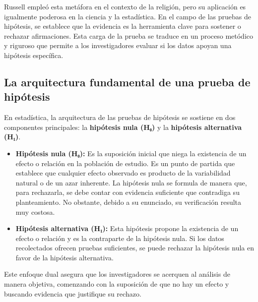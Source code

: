 \documentclass[
  letterpaper,
  DIV=11,
  numbers=noendperiod]{scrreprt}
\begin{document}
Russell empleó esta metáfora en el contexto de la religión, pero su
aplicación es igualmente poderosa en la ciencia y la estadística. En el
campo de las pruebas de hipótesis, se establece que la evidencia es la
herramienta clave para sostener o rechazar afirmaciones. Esta carga de
la prueba se traduce en un proceso metódico y riguroso que permite a los
investigadores evaluar si los datos apoyan una hipótesis específica.

\subsection{La arquitectura fundamental de una prueba de
hipótesis}\label{la-arquitectura-fundamental-de-una-prueba-de-hipuxf3tesis}

En estadística, la arquitectura de las pruebas de hipótesis se sostiene
en dos componentes principales: la \textbf{hipótesis nula (H₀)} y la
\textbf{hipótesis alternativa (H₁)}.

\begin{itemize}
\item
  \textbf{Hipótesis nula (H₀):} Es la suposición inicial que niega la
  existencia de un efecto o relación en la población de estudio. Es un
  punto de partida que establece que cualquier efecto observado es
  producto de la variabilidad natural o de un azar inherente. La
  hipótesis nula se formula de manera que, para rechazarla, se debe
  contar con evidencia suficiente que contradiga su planteamiento. No
  obstante, debido a su enunciado, su verificación resulta muy costosa.
\item
  \textbf{Hipótesis alternativa (H₁):} Esta hipótesis propone la
  existencia de un efecto o relación y es la contraparte de la hipótesis
  nula. Si los datos recolectados ofrecen pruebas suficientes, se puede
  rechazar la hipótesis nula en favor de la hipótesis alternativa.
\end{itemize}

Este enfoque dual asegura que los investigadores se acerquen al análisis
de manera objetiva, comenzando con la suposición de que no hay un efecto
y buscando evidencia que justifique su rechazo.
\end{document}
